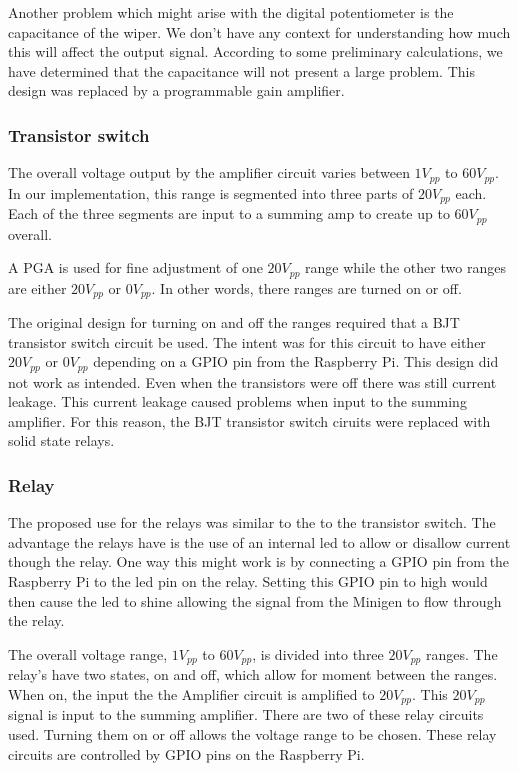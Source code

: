 \documentclass{article}	%
\begin{document}
\begin{multicols}{2}
Another problem which might arise with the digital potentiometer is the capacitance of the wiper. We don’t have any context for understanding how much this will affect the output signal. According to some preliminary calculations, we have determined that the capacitance will not present a large problem.
This design was replaced by a programmable gain amplifier.

\subsubsection{Transistor switch}
The overall voltage output by the amplifier circuit
varies between $1V_{pp}$ to $60V_{pp}$.
In our implementation,
this range is segmented into three parts of $20V_{pp}$ each.
Each of the three segments are input to a summing amp to
create up to $60V_{pp}$ overall.

A PGA is used for fine adjustment of one $20V_{pp}$ range while
the other two ranges are either $20V_{pp}$ or $0V_{pp}$.
In other words,
there ranges are turned on or off.

The original design for turning on and off the ranges
required that a BJT transistor switch circuit be used.
The intent was for this circuit to have either $20V_{pp}$ or $0V_{pp}$
depending on a GPIO pin from the Raspberry Pi.
This design did not work as intended.
Even when the transistors were off there was still current leakage.
This current leakage caused problems when input to the summing amplifier.
For this reason, the BJT transistor switch ciruits were replaced with solid state relays.

\subsubsection{Relay}
The proposed use for the relays was
similar to the to the transistor switch.
The advantage the relays have is the use
of an internal led to allow or disallow
current though the relay.
One way this might work is by
connecting a GPIO pin from the Raspberry Pi to
the led pin on the relay.
Setting this GPIO pin to high would then
cause the led to shine allowing the signal
from the Minigen to flow through the relay.

The overall voltage range,
$1V_{pp}$ to $60V_{pp}$,
is divided into three $20V_{pp}$ ranges.
The relay's have two states,
on and off,
which allow for moment between the ranges.
When on,
the input the the Amplifier circuit is amplified to $20V_{pp}$.
This $20V_{pp}$ signal is input to the summing amplifier.
There are two of these relay circuits used.
Turning them on or off allows the voltage range to be chosen.
These relay circuits are controlled by 
GPIO pins on the Raspberry Pi.


\end{multicols}
\end{document}

